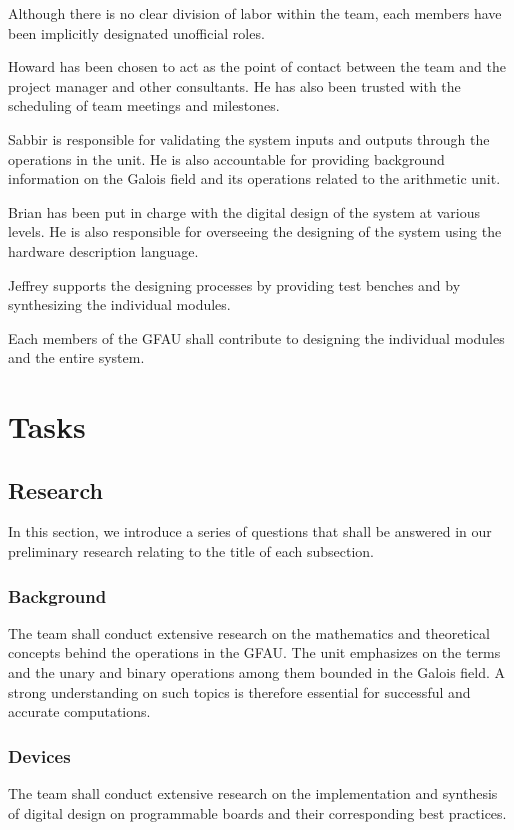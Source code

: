 \documentclass[paper=usletter, fontsize=12pt]{article}
\begin{document}
Although there is no clear division of labor within the team, each members have been implicitly designated unofficial roles.

Howard has been chosen to act as the point of contact between the team and the project manager and other consultants. He has also been trusted with the scheduling of team meetings and milestones.

Sabbir is responsible for validating the system inputs and outputs through the operations in the unit. He is also accountable for providing background information on the Galois field and its operations related to the arithmetic unit.

Brian has been put in charge with the digital design of the system at various levels. He is also responsible for overseeing the designing of the system using the hardware description language.

Jeffrey supports the designing processes by providing test benches and by synthesizing the individual modules.

Each members of the GFAU shall contribute to designing the individual modules and the entire system.

    \section{Tasks}

        \subsection{Research}In this section, we introduce a series of questions that shall be answered in our preliminary research relating to the title of each subsection.

        \subsubsection{Background}The team shall conduct extensive research on the mathematics and theoretical concepts behind the operations in the GFAU. The unit emphasizes on the terms and the unary and binary operations among them bounded in the Galois field. A strong understanding on such topics is therefore essential for successful and accurate computations. 
        \subsubsection{Devices}The team shall conduct extensive research on the implementation and synthesis of digital design on programmable boards and their corresponding best practices. 
        
\end{document}

